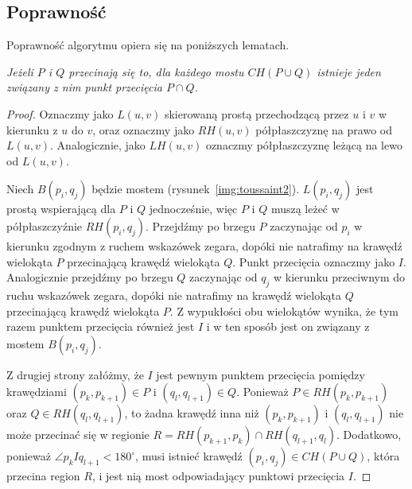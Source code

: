 \subsection{Poprawność}
Poprawność algorytmu opiera się na poniższych lematach.

\begin{lemat}
  \em{\cite{ToussaintInt}} \em Jeżeli $P$ i $Q$ przecinają się to, dla
  każdego mostu $CH(P \cup Q)$ istnieje jeden związany z nim punkt
  przecięcia $P \cap Q$.
\end{lemat}

\begin{proof}
  Oznaczmy jako $L(u, v)$ skierowaną prostą przechodzącą przez $u$ i
  $v$ w kierunku z $u$ do $v$, oraz oznaczmy jako $RH(u, v)$
  półpłaszczyznę na prawo od $L(u, v)$. Analogicznie, jako $LH(u, v)$
  oznaczmy półpłaszczyznę leżącą na lewo od $L(u, v)$.

  Niech $B(p_i, q_j)$ będzie mostem
  (rysunek~\ref{img:toussaint2}). $L(p_i, q_j)$ jest prostą
  wspierającą dla $P$ i $Q$ jednocześnie, więc $P$ i $Q$ muszą leżeć w
  półpłaszczyźnie $RH(p_i, q_j)$. Przejdźmy po brzegu $P$ zaczynając
  od $p_i$ w kierunku zgodnym z ruchem wskazówek zegara, dopóki nie
  natrafimy na krawędź wielokąta $P$ przecinającą krawędź wielokąta
  $Q$. Punkt przecięcia oznaczmy jako $I$. Analogicznie przejdźmy po
  brzegu $Q$ zaczynając od $q_j$ w kierunku przeciwnym do ruchu
  wskazówek zegara, dopóki nie natrafimy na krawędź wielokąta $Q$
  przecinającą krawędź wielokąta $P$. Z wypukłości obu wielokątów
  wynika, że tym razem punktem przecięcia również jest $I$ i w ten
  sposób jest on związany z mostem $B(p_i, q_j)$.

  Z drugiej strony załóżmy, że $I$ jest pewnym punktem przecięcia
  pomiędzy krawędziami $(p_k, p_{k+1}) \in P$ i $(q_l, q_{l+1}) \in
  Q$. Ponieważ $P \in RH(p_k, p_{k+1})$ oraz $Q \in RH(q_l, q_{l+1})$,
  to żadna krawędź inna niż $(p_k, p_{k+1})$ i $(q_l, q_{l+1})$ nie
  może przecinać się w regionie $R = RH(p_{k+1}, p_k) \cap RH(q_{l+1},
  q_l)$. Dodatkowo, ponieważ $\angle p_{k}Iq_{l+1} < 180^{\circ}$,
  musi istnieć krawędź $(p_i, q_j) \in CH(P \cup Q)$, która przecina
  region $R$, i jest nią most odpowiadający punktowi przecięcia $I$.
\end{proof}

